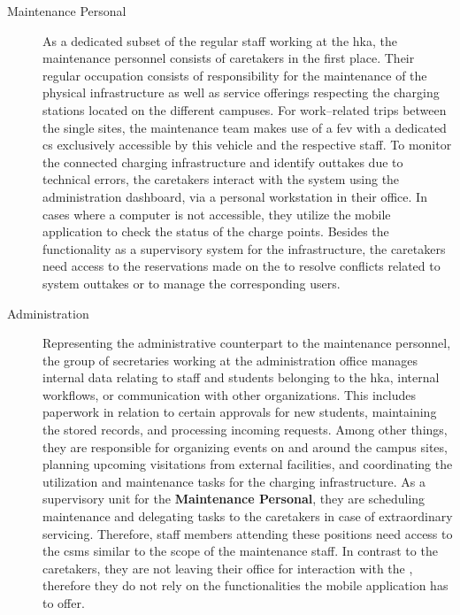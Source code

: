 \newpage

\begin{description}
    \item[Maintenance Personal] As a dedicated subset of the regular staff working at the \acrshort{hka}, the maintenance personnel consists of caretakers in the first place. Their regular occupation consists of responsibility for the maintenance of the physical infrastructure as well as service offerings respecting the charging stations located on the different campuses.
    For work--related trips between the single sites, the maintenance team makes use of a \acrshort{fev} with a dedicated \acrshort{cs} exclusively accessible by this vehicle and the respective staff.
    To monitor the connected charging infrastructure and identify outtakes due to technical errors, the caretakers interact with the system using the administration dashboard, via a personal workstation in their office. In cases where a computer is not accessible, they utilize the mobile application to check the status of the charge points.
    Besides the functionality as a supervisory system for the infrastructure, the caretakers need access to the reservations made on the  to resolve conflicts related to system outtakes or to manage the corresponding users.
    \item[Administration] Representing the administrative counterpart to the maintenance personnel, the group of secretaries working at the administration office manages internal data relating to staff and students belonging to the \acrshort{hka}, internal workflows, or communication with other organizations.
    This includes paperwork in relation to certain approvals for new students, maintaining the stored records, and processing incoming requests. Among other things, they are responsible for organizing events on and around the campus sites, planning upcoming visitations from external facilities, and coordinating the utilization and maintenance tasks for the charging infrastructure.
    As a supervisory unit for the \textbf{Maintenance Personal}, they are scheduling maintenance and delegating tasks to the caretakers in case of extraordinary servicing.
    Therefore, staff members attending these positions need access to the \acrshort{csms} similar to the scope of the maintenance staff. In contrast to the caretakers, they are not leaving their office for interaction with the , therefore they do not rely on the functionalities the mobile application has to offer.
\end{description}

